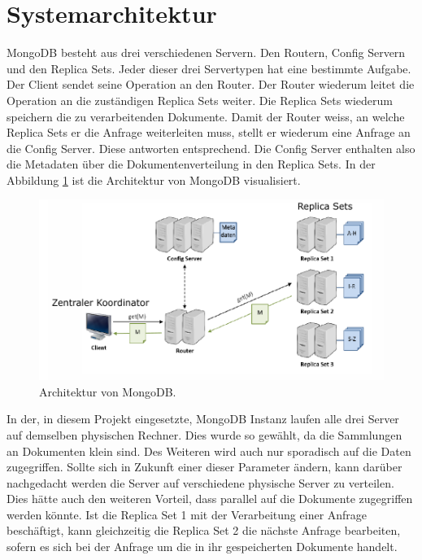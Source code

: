  \section{Systemarchitektur}
 MongoDB besteht aus drei verschiedenen Servern. Den Routern, Config Servern und
 den Replica Sets. Jeder dieser drei Servertypen hat eine bestimmte Aufgabe.
 Der Client sendet seine Operation an den Router. Der Router wiederum leitet
 die Operation an die zuständigen Replica Sets weiter. Die Replica Sets wiederum 
 speichern die zu verarbeitenden Dokumente. Damit der Router weiss, an welche
 Replica Sets er die Anfrage weiterleiten muss, stellt er wiederum eine Anfrage
 an die Config Server. Diese antworten entsprechend. Die Config Server enthalten 
 also die Metadaten über die Dokumentenverteilung in den Replica Sets.
 In der Abbildung \ref{fig:archmong} ist die Architektur von MongoDB
 visualisiert.
 \begin{figure}[htbp]
 \centering
    \includegraphics[width=1\textwidth]{./pictures/Architektur_MongoDB.png}
 \caption{Architektur von MongoDB. \cite{Kaufmann2016_DB}}
 \label{fig:archmong}
 \end{figure}
 In der, in diesem Projekt eingesetzte, MongoDB Instanz laufen alle drei Server
 auf demselben physischen Rechner. Dies wurde so gewählt, da die Sammlungen an
 Dokumenten klein sind. Des Weiteren wird auch nur sporadisch auf die Daten
 zugegriffen. Sollte sich in Zukunft einer dieser Parameter ändern, kann darüber
 nachgedacht werden die Server auf verschiedene physische Server zu
 verteilen. Dies hätte auch den weiteren Vorteil, dass parallel auf die
 Dokumente zugegriffen werden könnte. Ist die Replica Set 1 mit der Verarbeitung
 einer Anfrage beschäftigt, kann gleichzeitig die Replica Set 2 die nächste
 Anfrage bearbeiten, sofern es sich bei der Anfrage um die in ihr gespeicherten
 Dokumente handelt. \\
